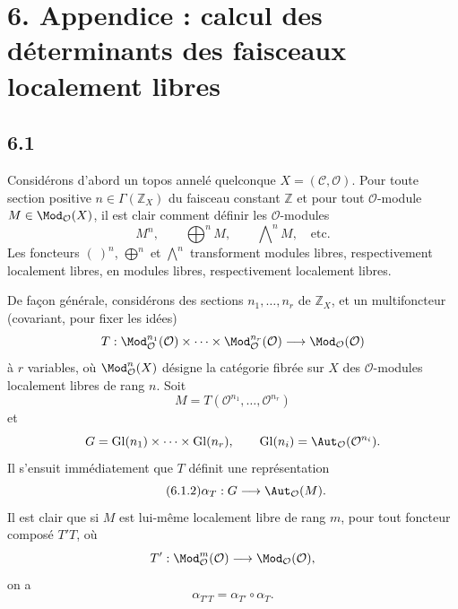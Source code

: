 \documentclass[11pt]{article}
\providecommand{\Gl}{\operatorname{Gl}}
\begin{document}
\section*{6. Appendice : calcul des déterminants des faisceaux localement libres}

\subsection*{6.1}
Considérons d'abord un topos annelé quelconque \(X=(\mathcal C,\mathcal O)\). Pour toute section positive \(n\in\Gamma(\mathbb Z_X)\) du faisceau constant \(\mathbb Z\) et pour tout \(\mathcal O\)-module \(M\in\Mod_{\mathcal O}(X)\), il est clair comment définir les \(\mathcal O\)-modules
\begin{equation}\tag{6.1.1}
 M^n,\qquad \bigoplus\nolimits^n M,\qquad \bigwedge\nolimits^n M,\quad\text{etc.}
\end{equation}
Les foncteurs \((\ )^n\), \(\bigoplus^n\) et \(\bigwedge^n\) transforment modules libres, respectivement localement libres, en modules libres, respectivement localement libres.

De façon générale, considérons des sections \(n_1,\ldots,n_r\) de \(\mathbb Z_X\), et un multifoncteur (covariant, pour fixer les idées)
\[
 T:\Mod_{\mathcal O}^{n_1}(\mathcal O)\times\cdots\times
 \Mod_{\mathcal O}^{n_r}(\mathcal O)\longrightarrow\Mod_{\mathcal O}(\mathcal O)
\]
à \(r\) variables, où \(\Mod_{\mathcal O}^{n}(X)\) désigne la catégorie fibrée sur \(X\) des \(\mathcal O\)-modules localement libres de rang \(n\). Soit
\[
 M=T(\mathcal O^{n_1},\ldots,\mathcal O^{n_r})
\]
et
\[
 G=\Gl(n_1)\times\cdots\times\Gl(n_r),
 \qquad \Gl(n_i)=\Aut_{\mathcal O}(\mathcal O^{n_i}).
\]
Il s'ensuit immédiatement que \(T\) définit une représentation
\begin{equation}\tag{6.1.2}
 \alpha_T:G\longrightarrow\Aut_{\mathcal O}(M).
\end{equation}
Il est clair que si \(M\) est lui-même localement libre de rang \(m\), pour tout foncteur composé \(T'T\), où
\[
 T':\Mod_{\mathcal O}^{m}(\mathcal O)\longrightarrow\Mod_{\mathcal O}(\mathcal O),
\]
on a
\begin{equation}\tag{6.1.3}
 \alpha_{T'T}=\alpha_{T'}\circ\alpha_T.
\end{equation}
\end{document}
